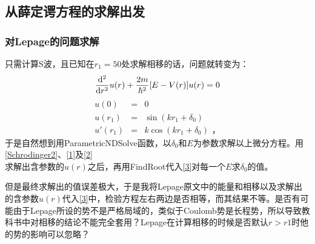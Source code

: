 \documentclass{ctexart}
\begin{document}
\subsection{从薛定谔方程的求解出发}
\subsubsection{对Lepage的问题求解}
只需计算S波，且已知在$r_1=50$处求解相移的话，问题就转变为：
\begin{equation}\label{Schrodinger2}
\dv[2]{r}u(r)+\frac{2m}{\hbar^2}\bqty{E-V(r)}u(r)=0
\end{equation}
\begin{eqnarray}
  \label{1}u(0) &=& 0 \\
  u(r_1) &=& \sin(kr_1+\delta_0)\label{2}
  \\  u'(r_1) &=& k\cos(kr_1+\delta_0)\label{3}
\text{  ，}
\end{eqnarray}
于是自然想到用ParametricNDSolve函数，以$\delta_0$和$E$为参数求解以上微分方程。用\eqref{Schrodinger2}、\eqref{1}及\eqref{2}\\求解出含参数的$u(r)$之后，再用FindRoot代入\eqref{3}对每一个$E$求$\delta_0$的值。

但是最终求解出的值误差极大，于是我将Lepage原文中的能量和相移以及求解出的含参数$u(r)$代入\eqref{3}中，检验方程左右两边是否相等，而其结果不等。是否有可能由于Lepage所设的势不是严格局域的，类似于Coulomb势是长程势，所以导致教科书中对相移的结论不能完全套用？Lepage在计算相移的时候是否默认$r>r1$时他的势的影响可以忽略？

\end{document}
